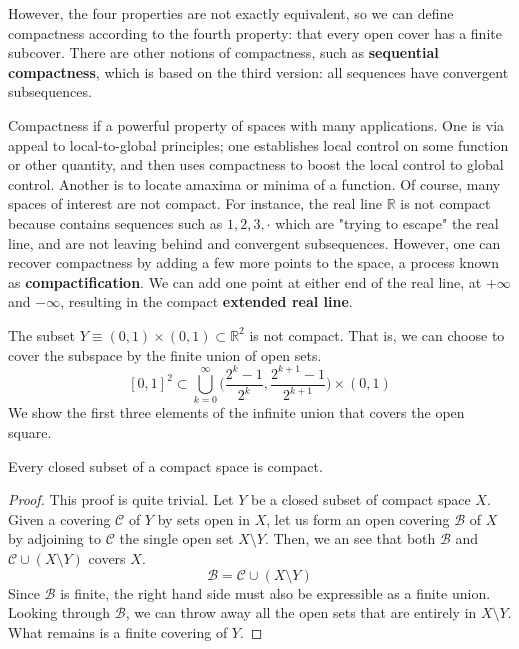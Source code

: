     However, the four properties are not exactly equivalent, so we can define compactness according to the fourth property: that every open cover has a finite subcover. There are other notions of compactness, such as \textbf{sequential compactness}, which is based on the third version: all sequences have convergent subsequences. 

    Compactness if a powerful property of spaces with many applications. One is via appeal to local-to-global principles; one establishes local control on some function or other quantity, and then uses compactness to boost the local control to global control. Another is to locate amaxima or minima of a function. Of course, many spaces of interest are not compact. For instance, the real line $\mathbb{R}$ is not compact because contains sequences such as $1, 2, 3, \cdot$ which are "trying to escape" the real line, and are not leaving behind and convergent subsequences. However, one can recover compactness by adding a few more points to the space, a process known as \textbf{compactification}. We can add one point at either end of the real line, at $+\infty$ and $-\infty$, resulting in the compact \textbf{extended real line}. 


    \begin{example}
    The subset $Y \equiv (0,1) \times (0,1) \subset \mathbb{R}^2$ is not compact. That is, we can choose to cover the subspace by the finite union of open sets. 
    \[[0,1]^2 \subset \bigcup_{k=0}^\infty \Big( \frac{2^k - 1}{2^k}, \frac{2^{k+1} - 1}{2^{k+1}} \Big) \times (0,1)\]
    We show the first three elements of the infinite union that covers the open square.  
    \begin{center}
    \end{center}
    \end{example}

    \begin{theorem}
    Every closed subset of a compact space is compact. 
    \end{theorem}
    \begin{proof}
    This proof is quite trivial. Let $Y$ be a closed subset of compact space $X$. Given a covering $\mathcal{C}$ of $Y$ by sets open in $X$, let us form an open covering $\mathscr{B}$ of $X$ by adjoining to $\mathcal{C}$ the single open set $X \setminus Y$. Then, we an see that both $\mathscr{B}$ and $\mathcal{C} \cup (X \setminus Y)$ covers $X$. 
    \[\mathscr{B} = \mathcal{C} \cup (X \setminus Y)\]
    Since $\mathscr{B}$ is finite, the right hand side must also be expressible as a finite union. Looking through $\mathscr{B}$, we can throw away all the open sets that are entirely in $X \setminus Y$. What remains is a finite covering of $Y$. 
    \end{proof}

